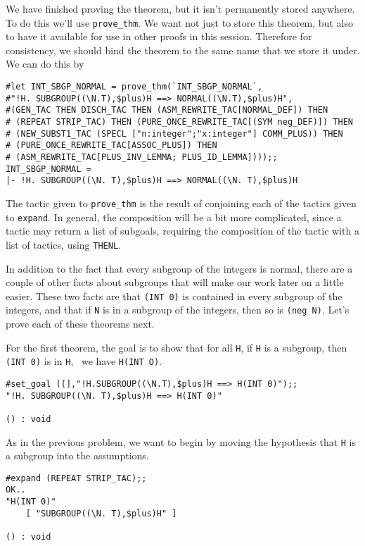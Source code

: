 We have finished proving the theorem, but it isn't permanently stored
anywhere.  To do this we'll use {\small\verb+prove_thm+}.  We
want not just to store this theorem, but also to have it available for
use in other proofs in this session.  Therefore for consistency, we
should bind the theorem to the same name that we store it under.  We
can do this by
\begin{session}
\begin{verbatim}
#let INT_SBGP_NORMAL = prove_thm(`INT_SBGP_NORMAL`,
#"!H. SUBGROUP((\N.T),$plus)H ==> NORMAL((\N.T),$plus)H",
#(GEN_TAC THEN DISCH_TAC THEN (ASM_REWRITE_TAC[NORMAL_DEF]) THEN
# (REPEAT STRIP_TAC) THEN (PURE_ONCE_REWRITE_TAC[(SYM neg_DEF)]) THEN
# (NEW_SUBST1_TAC (SPECL ["n:integer";"x:integer"] COMM_PLUS)) THEN
# (PURE_ONCE_REWRITE_TAC[ASSOC_PLUS]) THEN
# (ASM_REWRITE_TAC[PLUS_INV_LEMMA; PLUS_ID_LEMMA])));;
INT_SBGP_NORMAL = 
|- !H. SUBGROUP((\N. T),$plus)H ==> NORMAL((\N. T),$plus)H
\end{verbatim}
\end{session}

The tactic given to {\small\verb+prove_thm+} is the result of
conjoining each of the tactics given to {\small\verb+expand+}.
In general, the composition will be a bit more complicated, since a
tactic may return a list of subgoals, requiring the composition of the
tactic with a list of tactics, using {\small\verb+THENL+}.

In addition to the fact that every subgroup of the integers is normal,
there are a couple of other facts about subgroups that will make our
work later on a little easier.  These two facts are that
{\small\verb+(INT 0)+} is contained in every subgroup of the
integers, and that if {\small\tt N} is in a subgroup of the integers,
then so is {\small\verb+(neg N)+}.  Let's prove each of these
theorems next.

For the first theorem, the goal is to show that for all {\small\tt H},
if {\small\tt H} is a subgroup, then {\small\verb+(INT 0)+} is in
{\small\tt H}, \ie\ we have {\small\verb+H(INT O)+}.
\begin{session}
\begin{verbatim}
#set_goal ([],"!H.SUBGROUP((\N.T),$plus)H ==> H(INT 0)");;
"!H. SUBGROUP((\N. T),$plus)H ==> H(INT 0)"

() : void
\end{verbatim}
\end{session}

As in the previous problem, we want to begin by moving the hypothesis
that {\small\tt H} is a subgroup into the assumptions.
\begin{session}
\begin{verbatim}
#expand (REPEAT STRIP_TAC);;
OK..
"H(INT 0)"
    [ "SUBGROUP((\N. T),$plus)H" ]

() : void
\end{verbatim}
\end{session}


